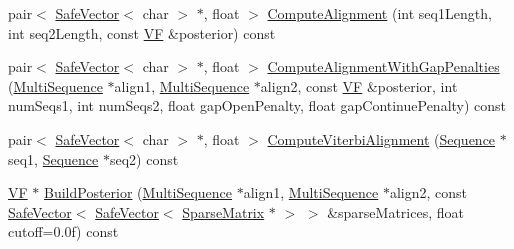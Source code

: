 \begin{DoxyCompactItemize}
\item 
pair$<$ \hyperlink{class_p_r_o_b_c_o_n_s_1_1_safe_vector}{Safe\+Vector}$<$ char $>$ $\ast$, float $>$ \hyperlink{class_p_r_o_b_c_o_n_s_1_1_probabilistic_model_a9233c1d04f152e972f33b311cc3e734f}{Compute\+Alignment} (int seq1\+Length, int seq2\+Length, const \hyperlink{namespace_p_r_o_b_c_o_n_s_a7d46b91dfef3fa4038545a492ad12221}{V\+F} \&posterior) const 
\item 
pair$<$ \hyperlink{class_p_r_o_b_c_o_n_s_1_1_safe_vector}{Safe\+Vector}$<$ char $>$ $\ast$, float $>$ \hyperlink{class_p_r_o_b_c_o_n_s_1_1_probabilistic_model_a67de41318f83963dbb18344c13922362}{Compute\+Alignment\+With\+Gap\+Penalties} (\hyperlink{class_p_r_o_b_c_o_n_s_1_1_multi_sequence}{Multi\+Sequence} $\ast$align1, \hyperlink{class_p_r_o_b_c_o_n_s_1_1_multi_sequence}{Multi\+Sequence} $\ast$align2, const \hyperlink{namespace_p_r_o_b_c_o_n_s_a7d46b91dfef3fa4038545a492ad12221}{V\+F} \&posterior, int num\+Seqs1, int num\+Seqs2, float gap\+Open\+Penalty, float gap\+Continue\+Penalty) const 
\item 
pair$<$ \hyperlink{class_p_r_o_b_c_o_n_s_1_1_safe_vector}{Safe\+Vector}$<$ char $>$ $\ast$, float $>$ \hyperlink{class_p_r_o_b_c_o_n_s_1_1_probabilistic_model_a0a97c9cbf1a085021d5f9c432e292847}{Compute\+Viterbi\+Alignment} (\hyperlink{class_p_r_o_b_c_o_n_s_1_1_sequence}{Sequence} $\ast$seq1, \hyperlink{class_p_r_o_b_c_o_n_s_1_1_sequence}{Sequence} $\ast$seq2) const 
\item 
\hyperlink{namespace_p_r_o_b_c_o_n_s_a7d46b91dfef3fa4038545a492ad12221}{V\+F} $\ast$ \hyperlink{class_p_r_o_b_c_o_n_s_1_1_probabilistic_model_a6c9642a3fe71c427a54d5edceeaedcba}{Build\+Posterior} (\hyperlink{class_p_r_o_b_c_o_n_s_1_1_multi_sequence}{Multi\+Sequence} $\ast$align1, \hyperlink{class_p_r_o_b_c_o_n_s_1_1_multi_sequence}{Multi\+Sequence} $\ast$align2, const \hyperlink{class_p_r_o_b_c_o_n_s_1_1_safe_vector}{Safe\+Vector}$<$ \hyperlink{class_p_r_o_b_c_o_n_s_1_1_safe_vector}{Safe\+Vector}$<$ \hyperlink{class_p_r_o_b_c_o_n_s_1_1_sparse_matrix}{Sparse\+Matrix} $\ast$ $>$ $>$ \&sparse\+Matrices, float cutoff=0.\+0f) const 
\end{DoxyCompactItemize}


